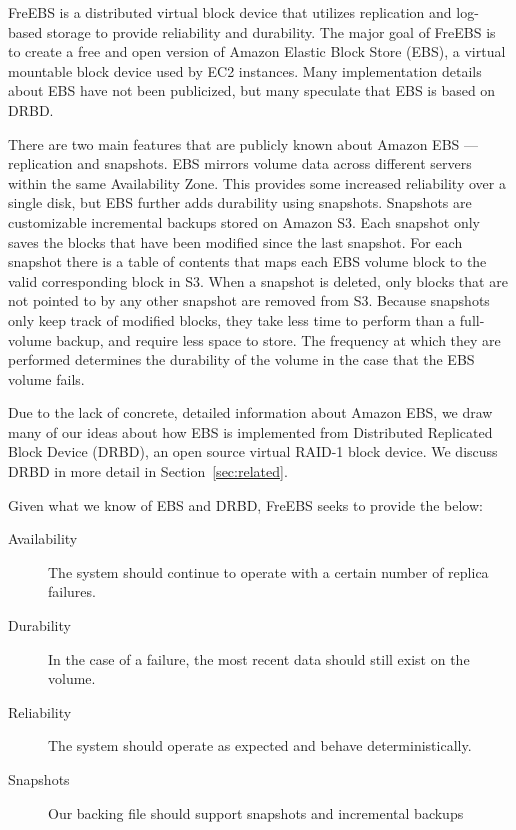 FreEBS is a distributed virtual block device that utilizes replication and 
log-based storage to provide reliability and durability. The major 
goal of FreEBS is to create a free and open version of Amazon Elastic Block 
Store (EBS)\cite{amazonEBS}, a virtual mountable block device used by EC2 
instances. Many implementation details about EBS have not been publicized,
but many speculate that EBS is based on 
DRBD\textsuperscript{\textregistered}\cite{drbd}. 

There are two main features that are publicly known about Amazon EBS --- 
replication and snapshots. EBS mirrors volume data across different 
servers within the same Availability Zone. This provides some increased 
reliability over a single disk, but EBS further adds durability using 
snapshots. Snapshots are 
customizable incremental backups stored on Amazon S3. Each snapshot only 
saves the blocks that have been modified since the last snapshot. For each
snapshot there is a table of contents that maps each EBS volume block to 
the valid corresponding block in S3. When a snapshot is deleted, only 
blocks that are not pointed to by any other snapshot are removed from S3. 
Because snapshots only keep track of modified blocks, they take less 
time to perform than a full-volume backup, and require less space to store. 
The frequency at which they are performed determines the durability of 
the volume in the case that the EBS volume fails. \cite{amazonEBS} 

Due to the lack of concrete, detailed information about Amazon EBS, we 
draw many of our ideas about how EBS is implemented from Distributed Replicated 
Block Device\textsuperscript{\textregistered} (DRBD)\cite{drbd}, an open source 
virtual RAID-1 block device. We discuss DRBD\textsuperscript{\textregistered}
in more detail in Section~\ref{sec:related}.

Given what we know of EBS and DRBD, FreEBS seeks to provide the below:

\begin{description}
    \item[Availability]{The system should continue to operate with a certain
            number of replica failures.}
    \item[Durability]{In the case of a failure, the most recent data should
            still exist on the volume.}
    \item[Reliability]{The system should operate as expected and behave
            deterministically.}
    \item[Snapshots]{Our backing file should support snapshots and incremental backups}
\end{description}

